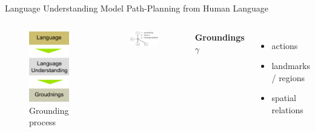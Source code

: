 \begin{frame}{Language Understanding}{ Model Path-Planning from Human Language }
\begin{columns}
	\begin{figure}
		\centering
		\includegraphics[width=.5\linewidth]{figure/language_understanding}
		\caption{Grounding process\footnotemark}
	\end{figure}	
	\begin{figure}
		\centering
		\includegraphics[width=.8\linewidth]{figure/factor_model}
	\end{figure}
	{\bf Groundings $ \gamma $}
	\begin{itemize}
		\item actions
		\item landmarks / regions
		\item spatial relations
	\end{itemize}
	

\end{columns}
\end{frame}
